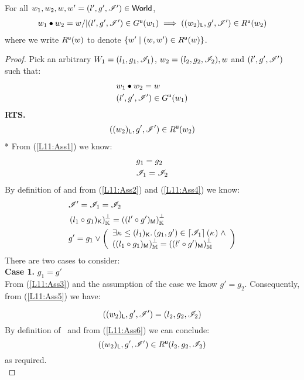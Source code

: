 \begin{lemma}[] \label{lem:updateGContainment}
%
For all $w_1, w_2, w, w' = (l', g', \mathscr{I}') \in \textsf{World}$,
%
\[
\begin{array}{l}
	w_1 \bullet w_2 = w /| (l', g', \mathscr{I}') \in G^{\textsf{u}}(w_1) \implies ((w_2)_{\textsf{L}}, g', \mathscr{I}') \in R^{\textsf{u}}(w_2)
\end{array}
\]
%
where we write $R^{\textsf{u}}(w)$ to denote $\left\{w' \mid (w, w') \in R^{\textsf{u}}(w) \right\}$.
%
\begin{proof} Pick an arbitrary $W_1 = (l_1, g_1, \mathscr{I}_{1})$, $w_2 = (l_2, g_2, \mathscr{I}_{2}), w$ and $(l', g', \mathscr{I}')$ such that:
%
\begin{align}
	& w_1 \bullet w_2 = w \label{L11:Ass1}\\
	& (l', g', \mathscr{I}') \in G^{\textsf{u}}(w_1) \label{L11:Ass2}
\end{align}
%
\textbf{RTS.}
%
\begin{align*}
	((w_2)_{\textsf{L}}, g', \mathscr{I}') \in R^{\textsf{u}}(w_2) 
\end{align*}
*
From (\ref{L11:Ass1}) we know:
%
\begin{align}
	&g_1 = g_2 \label{L11:Ass3}\\
	&\mathscr{I}_{1} = \mathscr{I}_{2} \label{L11:Ass4}
\end{align}
%
By definition of \updateG and from (\ref{L11:Ass2}) and (\ref{L11:Ass4}) we know:
%
\begin{align}
	& \mathscr{I}' = \mathscr{I}_{1} = \mathscr{I}_{2}  \label{L11:Ass5} \\
	& \left( l_1 \circ g_1)_{\textsf{K}}\right)_{\mathbb{K}}^{\bot} = \left( (l' \circ g')_{\textsf{M}}\right)_{\mathbb{K}}^{\bot} \label{L11:Perms} \\
	& g' = g_1 \lor 
	\left(\begin{array}{l}
		\exists \kappa_{} \leq (l_1)_{\textsf{K}}.\,  (g_1, g') \in \left\lceil \mathscr{I}_{1}\right\rceil(\kappa_{}) \;\land \\
		\left( (l_1 \circ g_1)_{\textsf{M}}\right)_{\mathbb{M}}^{\bot} = \left( (l' \circ g')_{\textsf{M}}\right)_{\mathbb{M}}^{\bot}
	\end{array} \right) \nonumber
\end{align}
%
There are two cases to consider:\\

\noindent\textbf{Case 1.} $g_1 = g'$\\
From (\ref{L11:Ass3}) and the assumption of the case we know $g' = g_2$. Consequently, from (\ref{L11:Ass5}) we have:

\begin{equation}
	((w_2)_{\textsf{L}}, g', \mathscr{I}') = (l_2, g_2, \mathscr{I}_{2}) \label{L11:Ass6}
\end{equation}
%
By definition of \updateR\ and from (\ref{L11:Ass6}) we can conclude:
%
\begin{equation}
	((w_2)_{\textsf{L}}, g', \mathscr{I}') \in R^{\textsf{u}}(l_2, g_2, \mathscr{I}_{2}) \label{L11:Ass7}
\end{equation}
%
as required.\\


\end{proof}
\end{lemma}
